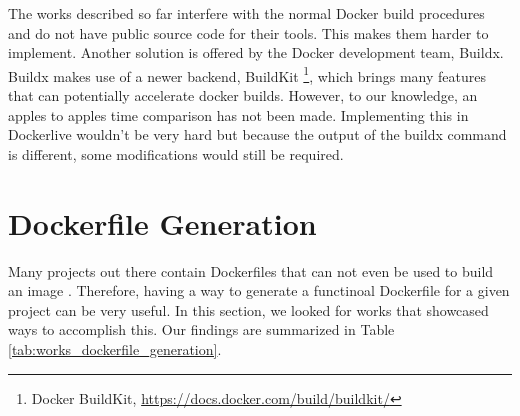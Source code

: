 The works described so far interfere with the normal Docker build procedures and do not have public source code for their tools. This makes them harder to implement. Another solution is offered by the Docker development team, Buildx. Buildx makes use of a newer backend, BuildKit \footnote{Docker BuildKit, \url{https://docs.docker.com/build/buildkit/}}, which brings many features that can potentially accelerate docker builds. However, to our knowledge, an apples to apples time comparison has not been made. Implementing this in Dockerlive wouldn't be very hard but because the output of the buildx command is different, some modifications would still be required.

\section{Dockerfile Generation} \label{sec:dockerfile_generation}

Many projects out there contain Dockerfiles that can not even be used to build an image \cite{wuEmpiricalStudyBuild2020,liDockerMockPreBuildDetection2021}. Therefore, having a way to generate a functinoal Dockerfile for a given project can be very useful. In this section, we looked for works that showcased ways to accomplish this. Our findings are summarized in Table \ref{tab:works_dockerfile_generation}.



